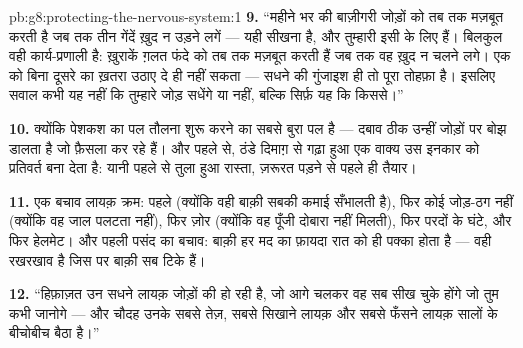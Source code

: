\begin{solution}{pb:g8:protecting-the-nervous-system:1}
\textbf{9.} ``महीने भर की बाज़ीगरी जोड़ों को तब तक मज़बूत करती है जब तक
तीन गेंदें ख़ुद न उड़ने लगें --- यही सीखना है, और तुम्हारी
 इसी के लिए हैं।  बिलकुल वही कार्य-प्रणाली है:
ख़ुराकें ग़लत फंदे को तब तक मज़बूत करती हैं जब तक वह ख़ुद न चलने लगे।
 एक को बिना दूसरे का ख़तरा उठाए दे ही नहीं सकता --- सधने की
गुंजाइश ही तो पूरा तोहफ़ा है। इसलिए सवाल कभी यह नहीं कि तुम्हारे जोड़
सधेंगे या नहीं, बल्कि सिर्फ़ यह कि किससे।''

\textbf{10.} क्योंकि पेशकश का पल तौलना शुरू करने का सबसे बुरा पल है ---
दबाव ठीक उन्हीं जोड़ों पर बोझ डालता है जो फ़ैसला कर रहे हैं। और पहले से,
ठंडे दिमाग़ से गढ़ा हुआ एक वाक्य उस इनकार को प्रतिवर्त बना देता है:
यानी पहले से तुला हुआ रास्ता, ज़रूरत पड़ने से पहले ही तैयार।

\textbf{11.} एक बचाव लायक़ क्रम: पहले  (क्योंकि वही बाक़ी सबकी कमाई
सँभालती है), फिर कोई जोड़-ठग नहीं (क्योंकि वह जाल पलटता नहीं), फिर
ज़ोर (क्योंकि वह पूँजी दोबारा नहीं मिलती), फिर परदों के घंटे, और फिर
हेलमेट। और पहली पसंद का बचाव: बाक़ी हर मद का फ़ायदा रात को ही पक्का होता
है ---  वही रखरखाव है जिस पर बाक़ी सब टिके हैं।

\textbf{12.} ``हिफ़ाज़त उन सधने लायक़ जोड़ों की हो रही है, जो आगे चलकर
वह सब सीख चुके होंगे जो तुम कभी जानोगे --- और चौदह उनके सबसे तेज़, सबसे
सिखाने लायक़ और सबसे फँसने लायक़ सालों के बीचोबीच बैठा है।''
\end{solution}
